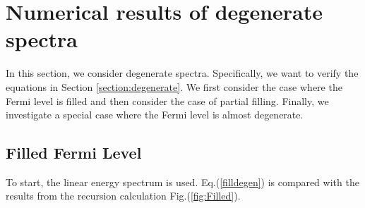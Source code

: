 


\section{Numerical results of degenerate spectra}
In this section, we consider degenerate spectra. Specifically, we want to verify the equations in Section \ref{section:degenerate}. We first consider the case where the Fermi level is filled and then consider the case of partial filling. Finally, we investigate a special case where the Fermi level is almost degenerate. 
\subsection{Filled Fermi Level}
To start, the linear energy spectrum is used. Eq.\@ (\ref{filldegen}) is compared with the results from the recursion calculation Fig.\@ (\ref{fig:Filled}).  


